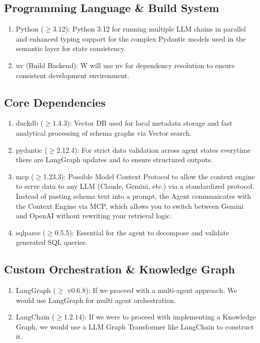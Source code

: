 \subsection{Programming Language \& Build System}
    \begin{enumerate}
        \item Python ($\ge 3.12$): Python 3.12 for running multiple LLM chains in parallel and enhanced typing support for the complex Pydantic models used in the semantic layer for state consistency.  
        \item uv (Build Backend): W will use uv for dependency resolution to ensure consistent development environment. 
    \end{enumerate}
\subsection{Core Dependencies}
    \begin{enumerate}
        \item duckdb ($\ge$1.4.3): Vector DB used for local metadata storage and fast analytical processing of schema graphs via Vector search. 
        \item pydantic ($\ge$2.12.4): For strict data validation across agent states everytime there are LangGraph updates and to ensure structured outputs. 
        \item mcp ($\ge$1.23.3): Possible Model Context Protocol to allow the context engine to serve data to any LLM (Claude, Gemini, etc.) via a standardized protocol. Instead of pasting schema text into a prompt, the Agent communicates with the Context Engine via MCP, which allows you to switch between Gemini and OpenAI without rewriting your retrieval logic.
        \item sqlparse ($\ge$0.5.5): Essential for the agent to decompose and validate generated SQL queries.
    \end{enumerate}
\subsection{Custom Orchestration \& Knowledge Graph}
    \begin{enumerate}
        \item LangGraph ($\ge$ v0.6.8): If we proceed with a multi-agent approach, We would use LangGraph for multi agent orchestration.
        \item LangChain ($\ge 1.2.14 $): If we were to proceed with implementing a Knowledge Graph, we would use a LLM Graph Transformer like LangChain to construct it. 
    \end{enumerate}

